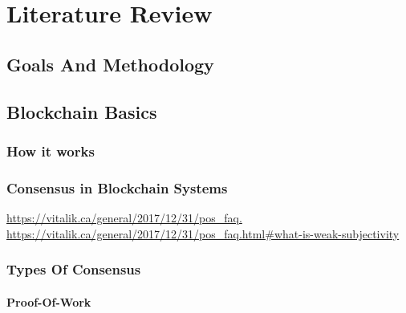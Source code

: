 \chapter{Literature Review}

\section{Goals And Methodology}



\section{Blockchain Basics}





\subsection{How it works}






\subsection{Consensus in Blockchain Systems}
\url{https://vitalik.ca/general/2017/12/31/pos_faq.}
\url{https://vitalik.ca/general/2017/12/31/pos_faq.html#what-is-weak-subjectivity}



\subsection{Types Of Consensus}





\subsubsection{Proof-Of-Work}




